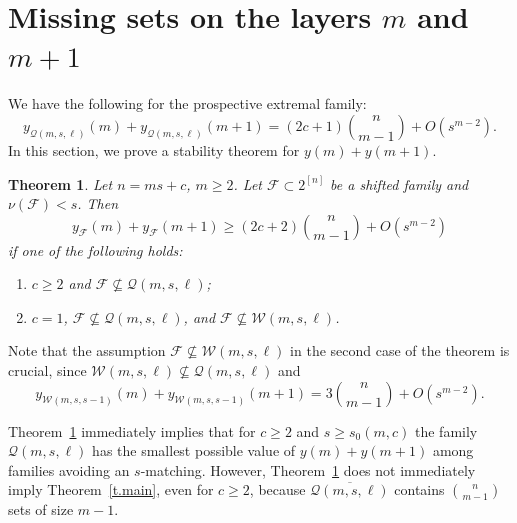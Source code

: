 \documentclass[12pt,a4paper]{article}
\newtheorem{theorem}{Theorem}
\begin{document}
\section{Missing sets on the layers $m$ and $m+1$} \label{s.ym_ym+1}

We have the following for the prospective extremal family:
\[
y_{\mathcal{Q}(m, s, \ell)}(m) + y_{\mathcal{Q}(m, s, \ell)}(m + 1) = (2c+1){n \choose m - 1} + O(s^{m - 2}).
\]
In this section, we prove a stability theorem for $y(m) + y(m + 1)$.


\begin{theorem} \label{t.layer_stability}
    Let $n = ms + c$, $m \geq 2$. Let $\mathcal{F} \subset 2^{[n]}$ be a shifted family and $\nu(\mathcal{F}) < s$. Then
    \[
    y_{\mathcal{F}}(m) + y_{\mathcal{F}}(m + 1) \geq (2c+2){n \choose m - 1} + O(s^{m - 2})
    \]
    if one of the following holds:
    \begin{enumerate}
        \item $c \geq 2$ and $\mathcal{F} \nsubseteq \mathcal{Q}(m, s, \ell)$;
        \item $c = 1$, $\mathcal{F} \nsubseteq \mathcal{Q}(m, s, \ell)$, and $\mathcal{F} \nsubseteq \mathcal{W}(m, s, \ell)$.
    \end{enumerate}
\end{theorem}

Note that the assumption $\mathcal{F} \nsubseteq \mathcal{W}(m, s, \ell)$ in the second case of the theorem is crucial, since $\mathcal{W}(m, s, \ell) \nsubseteq \mathcal{Q}(m, s, \ell)$ and
\[
y_{\mathcal{W}(m, s, s-1)}(m) + y_{\mathcal{W}(m, s, s-1)}(m+1) = 3{n \choose m - 1} + O(s^{m - 2}).
\]

Theorem~\ref{t.layer_stability} immediately implies that for $c \geq 2$ and $s \geq s_0(m, c)$ the family $\mathcal{Q}(m, s, \ell)$ has the smallest possible value of $y(m) + y(m + 1)$ among families avoiding an $s$-matching. However, Theorem~\ref{t.layer_stability} does not immediately imply Theorem~\ref{t.main}, even for $c \geq 2$, because $\overline{\mathcal{Q}(m, s, \ell)}$ contains ${n \choose m - 1}$ sets of size $m - 1$.
\end{document}
